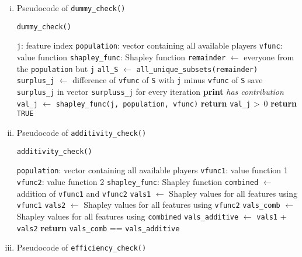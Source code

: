 {\begin{enumerate}[a)]
\begin{enumerate}[(i)]
	\item Pseudocode of \texttt{dummy\_check()}
	
	\begin{algorithm}[H]
		\caption{\texttt{dummy\_check()}}
		\begin{algorithmic}[1]
			\Require \texttt{j}: feature index
			\Require \texttt{population}: vector containing all available players
			\Require \texttt{vfunc}: value function
			\Require \texttt{shapley\_func}: Shapley function
			\State \texttt{remainder} $\gets$ everyone from the \texttt{population} but \texttt{j}
			\State \texttt{all\_S} $\gets$ \texttt{all\_unique\_subsets(remainder)}
			\State \texttt{surplus\_j} $\gets$ difference of \texttt{vfunc} of \texttt{S} with \texttt{j} minus \texttt{vfunc} of \texttt{S}
			\State save \texttt{surplus\_j} in vector \texttt{surpluss\_j} for every iteration
			\EndFor
			\State \textbf{print} \textit{has contribution}
			\State \texttt{val\_j} $\gets$ \texttt{shapley\_func(j, population, vfunc)}
			\State \textbf{return} \texttt{val\_j} \textgreater\, 0
			\EndIf
			\State \textbf{return} \texttt{TRUE}
		\end{algorithmic}
	\end{algorithm}

	\item Pseudocode of \texttt{additivity\_check()}
	
	\begin{algorithm}[H]
		\caption{\texttt{additivity\_check()}}
		\begin{algorithmic}[1]
			\Require \texttt{population}: vector containing all available players
			\Require \texttt{vfunc1}: value function 1
			\Require \texttt{vfunc2}: value function 2
			\Require \texttt{shapley\_func}: Shapley function
			\State \texttt{combined} $\gets$ addition of \texttt{vfunc1} and \texttt{vfunc2}
			\State \texttt{vals1} $\gets$ Shapley values for all features using \texttt{vfunc1}
			\State \texttt{vals2} $\gets$ Shapley values for all features using \texttt{vfunc2}
			\State \texttt{vals\_comb} $\gets$ Shapley values for all features using \texttt{combined}
			\State \texttt{vals\_additive} $\gets$ \texttt{vals1} + \texttt{vals2}
			\State \textbf{return} \texttt{vals\_comb} == \texttt{vals\_additive}
		\end{algorithmic}
	\end{algorithm}

	\item Pseudocode of \texttt{efficiency\_check()}
	

\end{enumerate}
\end{enumerate}}
